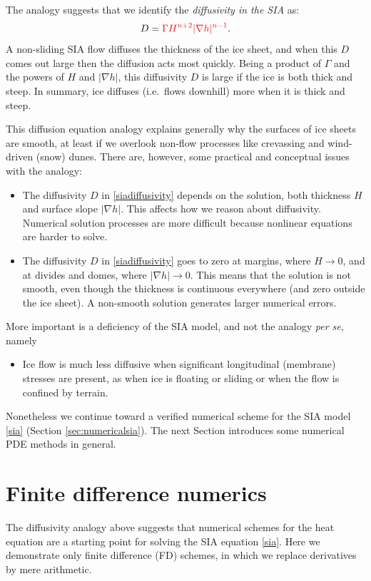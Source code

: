 \documentclass[letterpaper,final,12pt,reqno]{amsart}
\newcommand{\grad}{\nabla}
\begin{document}
The analogy suggests that we identify the \emph{diffusivity in the SIA} as:
\begin{equation}
	D = {\color{red}\Gamma H^{n+2} |\grad h|^{n-1}}.  \label{siadiffusivity}
\end{equation}
A non-sliding SIA flow diffuses the thickness of the ice sheet, and when this $D$ comes out large then the diffusion acts most quickly.  Being a product of $\Gamma$ and the powers of $H$ and $|\grad h|$, this diffusivity $D$ is large if the ice is both thick and steep.  In summary, ice diffuses (i.e.~flows downhill) more when it is thick and steep.

This diffusion equation analogy explains generally why the surfaces of ice sheets are smooth, at least if we overlook non-flow processes like crevassing and wind-driven (snow) dunes.  There are, however, some practical and conceptual issues with the analogy:
\begin{itemize}
\item The diffusivity $D$ in \eqref{siadiffusivity} depends on the solution, both thickness $H$ and surface slope $|\grad h|$.  This affects how we reason about diffusivity.  Numerical solution processes are more difficult because nonlinear equations are harder to solve.
\item The diffusivity $D$ in \eqref{siadiffusivity} goes to zero at margins, where $H\to 0$, and at divides and domes, where $|\grad h|\to 0$.  This means that the solution is not smooth, even though the thickness is continuous everywhere (and zero outside the ice sheet).  A non-smooth solution generates larger numerical errors.
\end{itemize}
More important is a deficiency of the SIA model, and not the analogy \emph{per se}, namely
\begin{itemize}
\item Ice flow is much less diffusive when significant longitudinal (membrane) stresses are present, as when ice is floating or sliding or when the flow is confined by terrain.
\end{itemize}
Nonetheless we continue toward a verified numerical scheme for the SIA model \eqref{sia} (Section \ref{sec:numericalsia}).  The next Section introduces some numerical PDE methods in general.

\section{Finite difference numerics} 

The diffusivity analogy above suggests that numerical schemes for the heat equation are a starting point for solving the SIA equation \eqref{sia}.  Here we demonstrate only finite difference (FD) schemes, in which we replace derivatives by mere arithmetic.
\end{document}

